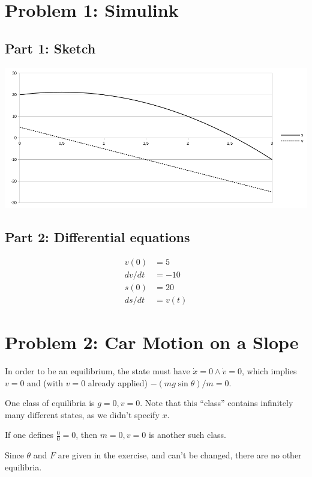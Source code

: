 \documentclass[a4paper,parskip,headheight=38pt]{scrartcl} %
\begin{document}
\section*{Problem 1: Simulink}

\subsection*{Part 1: Sketch}

\includegraphics[width=\textwidth]{p1-sketch}

\subsection*{Part 2: Differential equations}

\begin{align*}
    v(0) &= 5 \\
    dv/dt &= -10 \\
    s(0) &= 20 \\
    ds/dt &= v(t)
\end{align*}


\section*{Problem 2: Car Motion on a Slope}

In order to be an equilibrium, the state must have $\dot{x} = 0 \land
\dot{v} = 0$, which implies $v=0$ and (with $v=0$ already applied) $-(m g
\sin \theta) / m = 0$.

One class of equilibria is $g=0, v=0$.  Note that this \enquote{class}
contains infinitely many different states, as we didn't specify $x$.

If one defines $\frac{0}{0} = 0$, then $m=0, v=0$ is another such class.

Since $\theta$ and $F$ are given in the exercise, and can't be changed,
there are no other equilibria.
\end{document}
